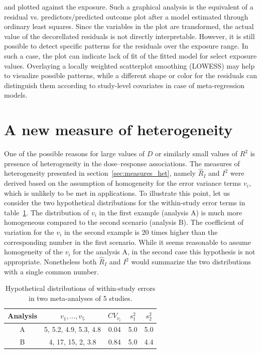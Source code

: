 \documentclass[11pt,a4paper,twoside,openany]{book}\usepackage{knitr}
\begin{document}
{\noindent and plotted against the exposure. Such a graphical analysis is the equivalent of a residual vs. predictors/predicted outcome plot after a model estimated through ordinary least squares. Since the variables in the plot are transformed, the actual value of the decorellated residuals is not directly interpretable. However, it is still possible to detect specific patterns for the residuals over the exposure range. In such a case, the plot can indicate lack of fit of the fitted model for select exposure values. Overlaying a locally weighted scatterplot smoothing (LOWESS) may help to visualize possible patterns, while a different shape or color for the residuals can distinguish them according to study-level covariates in case of meta-regression models.



\section{A new measure of heterogeneity}\label{sec:Rb}

One of the possible reasons for large values of $D$ or similarly small values of $R^2$ is presence of heterogeneity in the dose--response associations. The measures of heterogeneity presented in section~\ref{sec:measures_het}, namely $\hat R_I$ and $I^2$ were derived based on the assumption of homogeneity for the error variance terms $v_i$, which is unlikely to be met in applications. To illustrate this point, let us consider the two hypothetical distributions for the within-study error terms in table~\ref{tab:hyp_vi}. The distribution of $v_i$ in the first example (analysis A) is much more homogeneous compared to the second scenario (analysis B). The coefficient of variation for the $v_i$ in the second example is 20 times higher than the corresponding number in the first scenario. While it seems reasonable to assume homogeneity of the $v_i$ for the analysis A, in the second case this hypothesis is not appropriate. Nonetheless both $\hat R_I$ and $I^2$ would summarize the two distributions with a single common number. 

\begin{table}[ht]
\centering
\caption{Hypothetical distributions of within-study errors 
in two meta-analyses of 5 studies.} 
\label{tab:hyp_vi}
\begin{tabular}{ccccc}
  \hline
Analysis & $v_1, \dots, v_5$ & $CV_{v_i}$ & $s_1^2$ & $s_2^2$ \\ 
  \hline
A & 5, 5.2, 4.9, 5.3, 4.8 & 0.04 & 5.0 & 5.0 \\ 
  B & 4, 17, 15, 2, 3.8 & 0.84 & 5.0 & 4.4 \\ 
   \hline
\end{tabular}
\end{table}


}
\end{document}
